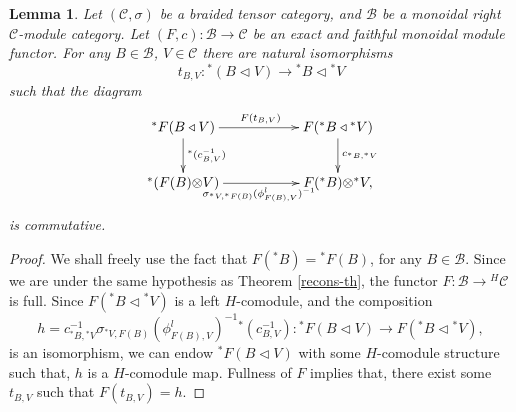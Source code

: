 \documentclass[11pt]{amsart}
\newcommand{\ot}{{\otimes}}
\newcommand{\vc}{{\mathcal C}}
\newcommand{\Bc}{{\mathcal B}}
\renewcommand{\_}[1]{\mbox{$_{\left( #1 \right)}$}}
\theoremstyle{plain}
\numberwithin{equation}{section}
\newtheorem{lema}[teo]{Lemma}
\theoremstyle{definition}
\theoremstyle{remark}
\def\pf{\begin{proof}}
\def\epf{\end{proof}}
\theoremstyle{introTheorems}
\begin{document}
\begin{lema}\label{antipode-lema}  Let $(\vc,\sigma)$ be a braided tensor category, and $\Bc$ be a monoidal  right  $\vc$-module category.
Let $(F,c):\Bc\to \vc$ be an exact and faithful  monoidal module functor.  For any $B\in \Bc$, $V\in \vc$ there are natural isomorphisms \begin{equation}\label{ts} t_{B,V}: {}^*(B \triangleleft V)\to {}^*B \triangleleft {}^*V\end{equation} such that the diagram
\begin{equation}\label{diagram-ts}
\xymatrix{
{}^*F(B \triangleleft V) \ar[d]^{{}^*(c^{-1}_{B,V})}\ar[rr]^{\qquad\; \qquad \; \qquad F(t_{B,V})\qquad \; \qquad\; \qquad}&& F({}^*B \triangleleft {}^*V)
 \ar[d]^{c_{{}^*B,{}^*V}} \\
 {}^*(F(B)\ot  V)\ar[rr]_{\qquad \qquad \; \qquad\sigma_{ {}^*V, {}^*F(B)} (\phi^l_{F(B),V})^{-1} \qquad \; \qquad\; \qquad}&&  F({}^*B) \ot {}^*V,}
\end{equation}
is commutative. 
\end{lema}
\pf  We shall freely use the fact that $F({}^*B)= {}^*F(B)$, for any $B\in \Bc$. Since we are under the same hypothesis as Theorem \ref{recons-th}, the functor $F:\Bc\to {}^H\vc$ is full. Since $F({}^*B \triangleleft {}^*V)$ is a left $H$-comodule, and the composition 
$$h=c^{-1}_{{}^*B,{}^*V} \sigma_{ {}^*V, F(B)} (\phi^l_{F(B),V})^{-1} {}^*(c^{-1}_{B,V}):{}^*F(B \triangleleft V)\to F({}^*B \triangleleft {}^*V),$$
 is an isomorphism, we can endow ${}^*F(B \triangleleft V)$ with some $H$-comodule structure such that, $h$ is a $H$-comodule map. Fullness of $F$ implies that, there exist some $t_{B,V}$ such that $F(t_{B,V})=h$.
\epf 
\end{document}
